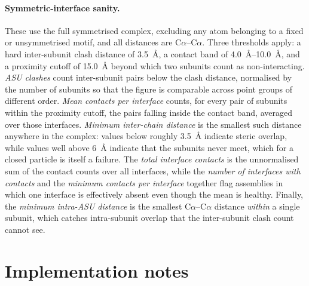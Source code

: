 \paragraph{Symmetric-interface sanity.}
These use the full symmetrised complex, excluding any atom belonging to a fixed
or unsymmetrised motif, and all distances are
C$\alpha$--C$\alpha$. Three thresholds apply: a hard inter-subunit clash distance
of \SI{3.5}{\angstrom}, a contact band of \SIrange{4.0}{10.0}{\angstrom}, and a
proximity cutoff of \SI{15.0}{\angstrom} beyond which two subunits count as
non-interacting. \emph{ASU clashes} count inter-subunit pairs below the clash
distance, normalised by the number of subunits so that the figure is comparable
across point groups of different order. \emph{Mean contacts per interface}
counts, for every pair of subunits within the proximity cutoff, the pairs falling
inside the contact band, averaged over those interfaces. \emph{Minimum
inter-chain distance} is the smallest such distance anywhere in the complex:
values below roughly \SI{3.5}{\angstrom} indicate steric overlap, while values
well above \SI{6}{\angstrom} indicate that the subunits never meet, which for a
closed particle is itself a failure. The \emph{total interface contacts} is the
unnormalised sum of the contact counts over all interfaces, while the
\emph{number of interfaces with contacts} and the \emph{minimum contacts per
interface} together flag assemblies in which one interface is effectively absent
even though the mean is healthy. Finally, the \emph{minimum intra-ASU distance}
is the smallest C$\alpha$--C$\alpha$ distance \emph{within} a single subunit,
which catches intra-subunit overlap that the inter-subunit clash count cannot
see.

\section{Implementation notes}
\label{app:implementation}

